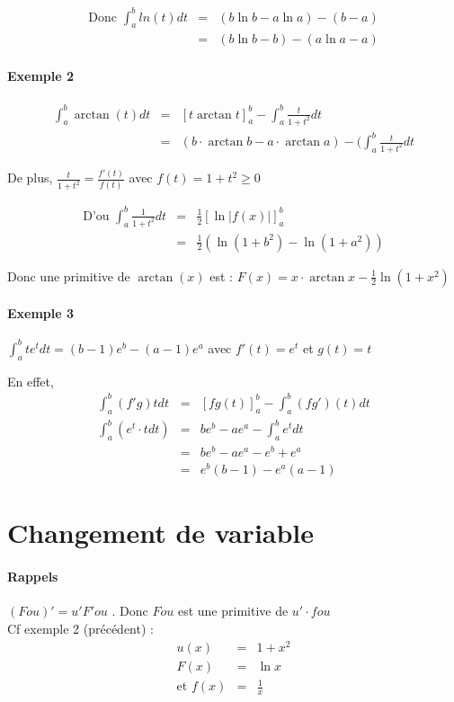 		\[\begin{array}{rcl}
				\text{Donc } \int_a^b ln(t)dt &=& (b \ln b - a \ln a) - (b-a) \\
										  &=& (b \ln b - b) - (a \ln a - a) \end{array}\]

	\paragraph{Exemple 2} \[\begin{array}{rcl}
		\int_a^b \arctan(t)dt &=& [t \arctan t]^b_a - \int_a^b \frac{t}{1+t^2} dt \\
																								   &=& (b \cdot \arctan b -a \cdot \arctan a) - (\int_a^b \frac{t}{1+t^2} dt \end{array}\]

		De plus, $\frac{t}{1+t^2} = \frac{f'(t)}{f(t)}$ avec $f(t) = 1+t^2 \geq 0$

		\[\begin{array}{rcl}
		\text{D'ou } \int_a^b \frac{1}{1+t^2} dt &=& \frac{1}{2}[\ln |f(x)|]^b_a \\
		  &=& \frac{1}{2} (\ln(1+b^2) - \ln(1+a^2)) \end{array}\]

		Donc une primitive de $\arctan(x)$ est : $F(x) = x \cdot \arctan x - \frac{1}{2}\ln(1+x^2)$

		\paragraph{Exemple 3} $\int_a^b te^t dt = (b-1)e^b - (a-1)e^a$ avec $f'(t) = e^t$ et $g(t) = t$

		En effet, \[\begin{array}{rcl}
				\int_a^b (f'g)t dt &=& [fg(t)]^b_a - \int_a^b (fg')(t)dt \\
				\int_a^b (e^t \cdot t dt) &=& b e^b - a e^a - \int_a^b e^t dt \\
									   &=& b e^b - a e^a - e^b + e^a \\
									   &=& e^b (b-1) - e^a (a-1)
		\end{array}\]

		\section{Changement de variable}

		\paragraph{Rappels} $(Fou)' = u'F'ou$ . Donc $Fou$ est une primitive de $u' \cdot fou$ ~\\
		Cf exemple 2 (précédent) : \[\begin{array}{rcl}
				u(x) &=& 1+x^2 \\
				F(x) &=& \ln x \\
		\text{et } f(x) &=& \frac{1}{x} \end{array}\]

